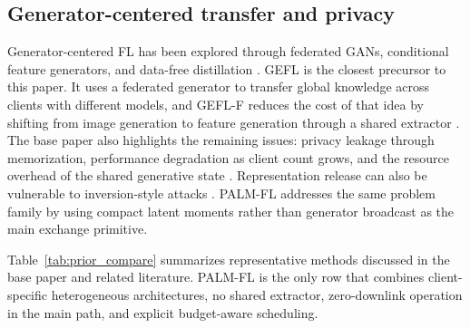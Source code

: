 \documentclass[10pt,journal]{IEEEtran}
\begin{document}
\subsection{Generator-centered transfer and privacy}
Generator-centered FL has been explored through federated GANs, conditional feature generators, and data-free distillation \cite{fedgan,fedcg,datafreekd,finetunekd}. GEFL is the closest precursor to this paper. It uses a federated generator to transfer global knowledge across clients with different models, and GEFL-F reduces the cost of that idea by shifting from image generation to feature generation through a shared extractor \cite{gefl}. The base paper also highlights the remaining issues: privacy leakage through memorization, performance degradation as client count grows, and the resource overhead of the shared generative state \cite{gefl}. Representation release can also be vulnerable to inversion-style attacks \cite{zeiler,mahendran,dosovitskiy}. PALM-FL addresses the same problem family by using compact latent moments rather than generator broadcast as the main exchange primitive.

Table~\ref{tab:prior_compare} summarizes representative methods discussed in the base paper and related literature. PALM-FL is the only row that combines client-specific heterogeneous architectures, no shared extractor, zero-downlink operation in the main path, and explicit budget-aware scheduling.
\end{document}
